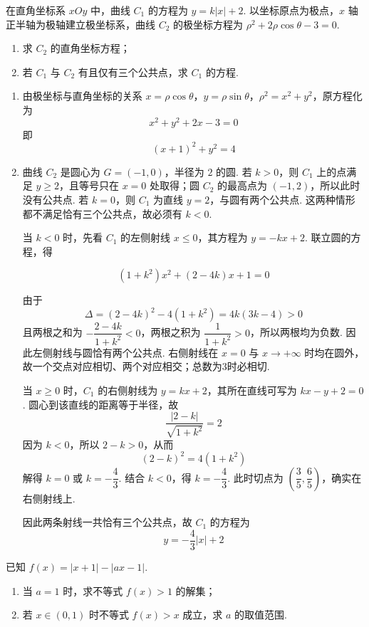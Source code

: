 \begin{problem}
在直角坐标系 \(xOy\) 中，曲线 \(C_1\) 的方程为 \(y=k\lvert x\rvert+2\). 以坐标原点为极点，\(x\) 轴正半轴为极轴建立极坐标系，曲线 \(C_2\) 的极坐标方程为 \(\rho^2+2\rho\cos\theta-3=0\).

\begin{enumerate}
\item 求 \(C_2\) 的直角坐标方程；
\item 若 \(C_1\) 与 \(C_2\) 有且仅有三个公共点，求 \(C_1\) 的方程.
\end{enumerate}
\end{problem}

\begin{solution}
\begin{enumerate}
\item 由极坐标与直角坐标的关系 \(x=\rho\cos\theta\)，\(y=\rho\sin\theta\)，\(\rho^2=x^2+y^2\)，原方程化为
\[
x^2+y^2+2x-3=0
\]
即
\[
(x+1)^2+y^2=4
\]

\item 曲线 \(C_2\) 是圆心为 \(G=(-1,0)\)，半径为 \(2\) 的圆. 若 \(k>0\)，则 \(C_1\) 上的点满足 \(y\ge2\)，且等号只在 \(x=0\) 处取得；圆 \(C_2\) 的最高点为 \((-1,2)\)，所以此时没有公共点. 若 \(k=0\)，则 \(C_1\) 为直线 \(y=2\)，与圆有两个公共点. 这两种情形都不满足恰有三个公共点，故必须有 \(k<0\).

当 \(k<0\) 时，先看 \(C_1\) 的左侧射线 \(x\le0\)，其方程为 \(y=-kx+2\). 联立圆的方程，得

\[
(1+k^2)x^2+(2-4k)x+1=0
\]

由于
\[
\Delta=(2-4k)^2-4(1+k^2)=4k(3k-4)>0
\]
且两根之和为 \(-\dfrac{2-4k}{1+k^2}<0\)，两根之积为 \(\dfrac1{1+k^2}>0\)，所以两根均为负数. 因此左侧射线与圆恰有两个公共点. 右侧射线在 \(x=0\) 与 \(x\to+\infty\) 时均在圆外，故一个交点对应相切、两个对应相交；总数为3时必相切.

当 \(x\ge0\) 时，\(C_1\) 的右侧射线为 \(y=kx+2\)，其所在直线可写为 \(kx-y+2=0\). 圆心到该直线的距离等于半径，故
\[
\frac{|2-k|}{\sqrt{1+k^2}}=2
\]
因为 \(k<0\)，所以 \(2-k>0\)，从而
\[
(2-k)^2=4(1+k^2)
\]
解得 \(k=0\) 或 \(k=-\dfrac43\). 结合 \(k<0\)，得 \(k=-\dfrac43\). 此时切点为 \(\left(\dfrac35,\dfrac65\right)\)，确实在右侧射线上.

因此两条射线一共恰有三个公共点，故 \(C_1\) 的方程为
\[
y=-\frac43|x|+2
\]
\end{enumerate}
\end{solution}

\begin{problem}
已知 \(f(x)=\lvert x+1\rvert-\lvert ax-1\rvert\).

\begin{enumerate}
\item 当 \(a=1\) 时，求不等式 \(f(x)>1\) 的解集；
\item 若 \(x\in(0,1)\) 时不等式 \(f(x)>x\) 成立，求 \(a\) 的取值范围.
\end{enumerate}
\end{problem}

